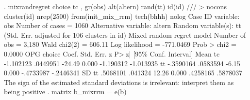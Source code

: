 . mixrandregret choice  tc , gr(obs) alt(altern) rand(tt) id(id) ///
> nocons cluster(id)  nrep(2500) from(init_mix_rrm) tech(bhhh)  nolog
{\smallskip}
Case ID variable: obs                          Number of cases    =       1060
Alternative variable: altern                   
Random variable(s): tt                         
{\smallskip}
                                 (Std. Err. adjusted for  106 clusters in id)
{\smallskip}
Mixed random regret model                       Number of obs     =      3,180
                                                Wald chi2(2)      =     606.11
Log likelihood =  -771.0469                     Prob > chi2       =     0.0000
{\smallskip}
             {\VBAR}                 OPG
      choice {\VBAR}      Coef.   Std. Err.      z    P>|z|     [95\% Conf. Interval]
Mean         {\VBAR}
          tc {\VBAR}  -1.102123   .0449951   -24.49   0.000    -1.190312   -1.013935
          tt {\VBAR}  -.3590164   .0583594    -6.15   0.000    -.4733987   -.2446341
SD           {\VBAR}
          tt {\VBAR}   .5068101    .041324    12.26   0.000     .4258165    .5878037
{\smallskip}
The sign of the estimated standard deviations is irrelevant: interpret them as
being positive
{\smallskip}
. matrix b_mixrrm = e(b)
{\smallskip}
